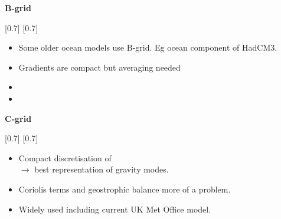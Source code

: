 \begin{minipage}[t]{0.28\columnwidth}%
\begin{center}
\textbf{B-grid}
\par\end{center}
%
{\scalebox{0.7}[0.7]{}}
{\scalebox{0.7}[0.7]{}}%
\end{minipage} %
\begin{minipage}[t]{0.7\columnwidth}%
\phantom{}
\begin{itemize}
\item Some older ocean models use B-grid. Eg ocean component of HadCM3.
\item Gradients are compact but averaging needed
\item {}
\item {}
\end{itemize}
%
\end{minipage}

\begin{minipage}[t]{0.28\columnwidth}%
\begin{center}
\textbf{C-grid}
\par\end{center}
%
{\scalebox{0.7}[0.7]{}}
{\scalebox{0.7}[0.7]{}}%
\end{minipage} %
\begin{minipage}[t]{0.7\columnwidth}%
\phantom{}
\begin{itemize}
\item Compact discretisation of \\
$\rightarrow$ best representation of gravity modes. 
\item Coriolis terms and geostrophic balance more of a problem.
\item Widely used including current UK Met Office model.
\end{itemize}
%
\end{minipage}

